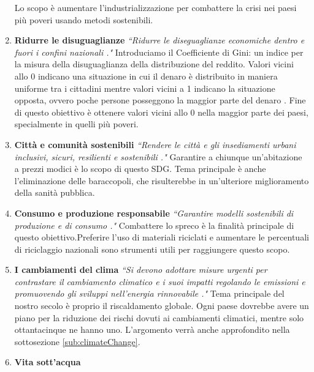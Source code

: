 \begin{enumerate}
Lo scopo è aumentare l'industrializzazione per combattere la crisi nei paesi più poveri usando metodi sostenibili.
\item \textbf{Ridurre le disuguaglianze}\newline
\textit{``Ridurre le diseguaglianze economiche dentro e fuori i confini nazionali \cite{goals}."}\newline
Introduciamo il Coefficiente di Gini: un indice per la misura della disuguaglianza della distribuzione del reddito.
Valori vicini allo 0 indicano una situazione in cui il denaro è distribuito in maniera uniforme tra i cittadini mentre valori vicini a 1 indicano la situazione opposta, ovvero poche persone posseggono la maggior parte del denaro \cite{gini}.\newline
Fine di questo obiettivo è ottenere valori vicini allo 0 nella maggior parte dei paesi, specialmente in quelli più poveri.
\item \textbf{Città e comunità sostenibili}\newline
\textit{``Rendere le città e gli insediamenti urbani inclusivi, sicuri, resilienti e sostenibili \cite{goals}."}\newline
Garantire a chiunque un'abitazione a prezzi modici è lo scopo di questo SDG. Tema principale è anche l'eliminazione delle baraccopoli, che risulterebbe in un'ulteriore miglioramento della sanità pubblica.
\item \textbf{Consumo e produzione responsabile}\newline
\textit{``Garantire modelli sostenibili di produzione e di consumo \cite{goals}."}\newline
Combattere lo spreco è la finalità principale di questo obiettivo.\newline Preferire l'uso di materiali riciclati e aumentare le percentuali di riciclaggio nazionali sono strumenti utili per raggiungere questo scopo.
\item \textbf{I cambiamenti del clima}\newline
\textit{``Si devono adottare misure urgenti per contrastare il cambiamento climatico e i suoi impatti regolando le emissioni e promuovendo gli sviluppi nell'energia rinnovabile \cite{goals}."}\newline
Tema principale del nostro secolo è proprio il riscaldamento globale. Ogni paese dovrebbe avere un piano per la riduzione dei rischi dovuti ai cambiamenti climatici, mentre solo ottantacinque ne hanno uno. L'argomento verrà anche approfondito nella sottosezione \ref{sub:climateChange}.
\item \textbf{Vita sott'acqua}\newline

\end{enumerate}
